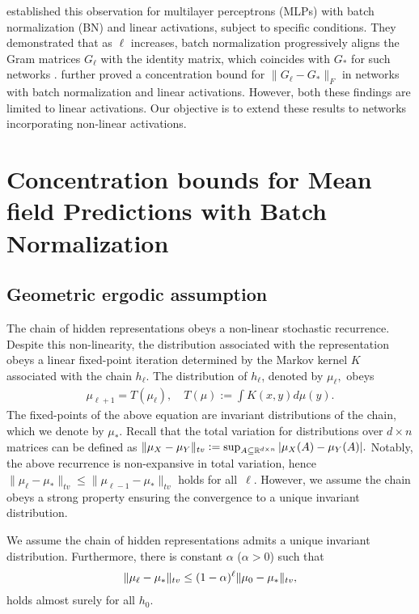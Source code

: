 \citet{daneshmand2021batch} established this observation for multilayer perceptrons (MLPs) with batch normalization (BN) and linear activations, subject to specific conditions. They demonstrated that as $\ell$ increases, batch normalization progressively aligns the Gram matrices $G_\ell$ with the identity matrix, which coincides with $G_*$ for such networks \cite{yang2018a}. \citet{yang2018a} further proved a concentration bound for $\|G_\ell - G_*\|_F$ in networks with batch normalization and linear activations. However, both these findings are limited to linear activations. Our objective is to extend these results to networks incorporating non-linear activations.




\section{Concentration bounds for Mean field Predictions with Batch Normalization}


\subsection{Geometric ergodic assumption} 
The chain of hidden representations obeys a non-linear stochastic recurrence. Despite this non-linearity, the distribution associated with the representation obeys a linear fixed-point iteration determined by the Markov kernel $K$ associated with the chain $h_\ell$. The distribution of $h_\ell$, denoted by $\mu_{\ell},$ obeys 
\begin{align} \label{MF:eq:dist_recurrence}
    \mu_{\ell+1} = T(\mu_{\ell}), \quad T(\mu) := \int K(x,y) d\mu(y).
\end{align}
The fixed-points of the above equation are invariant distributions of the chain, which we denote by $\mu_*$.  Recall that the total variation for distributions over $d\times n$ matrices can be defined as $\lVert\mu_{X}-\mu_{Y}\rVert_{tv}:=\sup_{A\subseteq\mathbb{R}^{d\times n}} |\mu_X(A)-\mu_Y(A)|.$
Notably, the above recurrence is non-expansive in total variation, hence $\|\mu_\ell - \mu_*\|_{tv} \leq \| \mu_{\ell-1} - \mu_* \|_{tv}$ holds for all~$\ell$.
However, we assume the chain obeys a strong property ensuring the convergence to a unique invariant distribution. 


\begin{assumption}\label{MF:ass:rapid_mixing}
 We assume the chain of hidden representations admits a unique invariant distribution. Furthermore, there is constant $\alpha$ ($\alpha>0$) such that
\begin{align*}
\lVert\mu_{\ell}-\mu_{*}\rVert_{tv} \le (1-\alpha)^\ell \lVert\mu_{0}-\mu_{*}\rVert_{tv},
\end{align*}
holds almost surely for all $h_0$.
\end{assumption}

